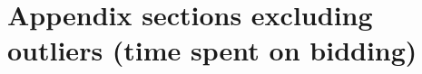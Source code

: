 \documentclass[12pt]{article}
\begin{document}
\clearpage



\section{Appendix sections excluding outliers (time spent on bidding)}



\begin{table}[H]
                \centering
                \caption{Interval Model of Consumer WTP for Oranges (Baseline: BDM Real)}
                \label{tab:interval_regression_Time1}
\end{table}
\end{document}
